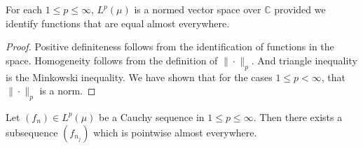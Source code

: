 \begin{theorem}
  For each $1 \le p \le \infty$, $L^p(\mu)$ is a normed vector space
  over $\mathbb{C}$ provided we identify functions that are equal
  almost everywhere.
\end{theorem}
\begin{proof}
  Positive definiteness follows from the identification of functions
  in the space. Homogeneity follows from the definition of
  $\|\cdot\|_p$. And triangle inequality is the Minkowski inequality.
  We have shown that for the cases $1 \le p < \infty$, that
  $\|\cdot\|_p$ is a norm.
\end{proof}

\begin{lemma}
  Let $(f_n) \in L^p( \mu)$ be a Cauchy sequence in $1 \le p \le
  \infty$. Then there exists a subsequence $(f_{n_j})$ which is
  pointwise almost everywhere.
\end{lemma}


